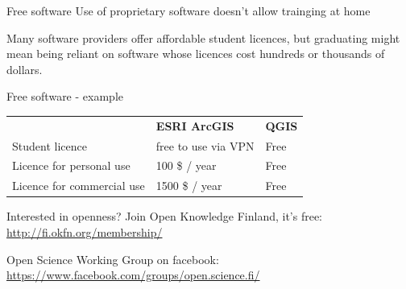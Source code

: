 \documentclass[]{beamer}
\begin{document}
\begin{frame}{Free software}
  Use of proprietary software doesn't allow trainging at home
  
  Many software providers offer affordable student licences, but graduating might mean being reliant on software whose licences cost hundreds or thousands of dollars.
\end{frame}

\begin{frame}{Free software - example}
  \begin{tabularx}{\textwidth}{lXl}
     & \textbf{ESRI ArcGIS} & \textbf{QGIS}\\
    Student licence & free to use via VPN & Free\\
    Licence for personal use & 100 \$ / year & Free\\
    Licence for commercial use & 1500 \$ / year & Free
  \end{tabularx}
\end{frame}

\begin{frame}{Interested in openness?}
  Join Open Knowledge Finland, it's free: \url{http://fi.okfn.org/membership/}
  
  Open Science Working Group on facebook: \url{https://www.facebook.com/groups/open.science.fi/}
\end{frame}
\end{document}
